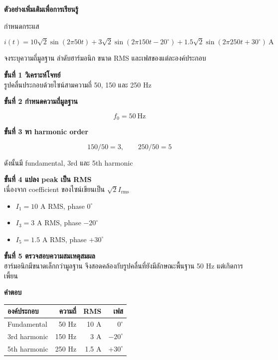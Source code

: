 \textbf{ตัวอย่างเพิ่มเติมเพื่อการเรียนรู้}

กำหนดกระแส

\[
i(t)=10\sqrt{2}\sin(2\pi 50t)+3\sqrt{2}\sin(2\pi 150t-20^\circ)+1.5\sqrt{2}\sin(2\pi 250t+30^\circ)\ \text{A}
\]

จงระบุความถี่มูลฐาน ลำดับฮาร์มอนิก ขนาด RMS และเฟสของแต่ละองค์ประกอบ

\textbf{ขั้นที่ 1 วิเคราะห์โจทย์} \\
รูปคลื่นประกอบด้วยไซน์สามความถี่ 50, 150 และ 250 Hz

\textbf{ขั้นที่ 2 กำหนดความถี่มูลฐาน}

\[
f_0=50\ \text{Hz}
\]

\textbf{ขั้นที่ 3 หา harmonic order}

\[
150/50=3,\qquad 250/50=5
\]

ดังนั้นมี fundamental, 3rd และ 5th harmonic

\textbf{ขั้นที่ 4 แปลง peak เป็น RMS} \\
เนื่องจาก coefficient ของไซน์เขียนเป็น $\sqrt{2}I_{\mathrm{rms}}$

\begin{itemize}
    \item $I_1=10$ A RMS, phase $0^\circ$
    \item $I_3=3$ A RMS, phase $-20^\circ$
    \item $I_5=1.5$ A RMS, phase $+30^\circ$
\end{itemize}

\textbf{ขั้นที่ 5 ตรวจสอบความสมเหตุสมผล} \\
ฮาร์มอนิกมีขนาดเล็กกว่ามูลฐาน จึงสอดคล้องกับรูปคลื่นที่ยังมีลักษณะพื้นฐาน 50 Hz แต่เกิดการเพี้ยน

\textbf{คำตอบ}

\begin{table}[htbp]
    \centering
    \begin{tabular}{l r r r}
        \hline
        \textbf{องค์ประกอบ} & \textbf{ความถี่} & \textbf{RMS} & \textbf{เฟส} \\
        \hline
        Fundamental & 50 Hz & 10 A & $0^\circ$ \\
        3rd harmonic & 150 Hz & 3 A & $-20^\circ$ \\
        5th harmonic & 250 Hz & 1.5 A & $+30^\circ$ \\
        \hline
    \end{tabular}
\end{table}

